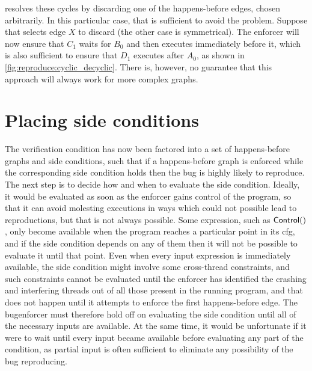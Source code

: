 {\Technique} resolves these cycles by discarding one of the
happens-before edges, chosen arbitrarily.  In this particular case,
that is sufficient to avoid the problem.  Suppose that {\technique}
selects edge $X$ to discard (the other case is symmetrical).  The
enforcer will now ensure that $C_1$ waits for $B_0$ and then executes
immediately before it, which is also sufficient to ensure that $D_1$
executes after $A_0$, as shown in
\autoref{fig:reproduce:cyclic_decyclic}.  There is, however, no
guarantee that this approach will always work for more complex graphs.

\section{Placing side conditions}
\label{sect:enforce:place_vcs}

The verification condition has now been factored into a set of
happens-before graphs and side conditions, such that if a
happens-before graph is enforced while the corresponding side
condition holds then the bug is highly likely to reproduce.  The next
step is to decide how and when to evaluate the side condition.
Ideally, it would be evaluated as soon as the enforcer gains control
of the program, so that it can avoid molesting executions in ways
which could not possible lead to reproductions, but that is not always
possible.  Some {\StateMachine} expression, such as
${\mathsf{Control}}()$, only become available when the program reaches
a particular point in its \gls{cfg}, and if the side condition depends
on any of them then it will not be possible to evaluate it until that
point.  Even when every input expression is immediately available, the
side condition might involve some cross-thread constraints, and such
constraints cannot be evaluated until the enforcer has identified the
crashing and interfering threads out of all those present in the
running program, and that does not happen until it attempts to enforce
the first happens-before edge.  The \gls{bugenforcer} must therefore
hold off on evaluating the side condition until all of the necessary
inputs are available.  At the same time, it would be unfortunate if it
were to wait until every input became available before evaluating any
part of the condition, as partial input is often sufficient to
eliminate any possibility of the bug reproducing.

